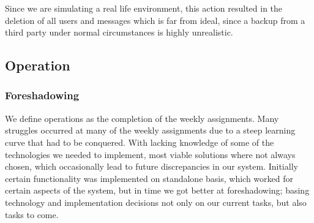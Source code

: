 \documentclass{article}
\begin{document}
    Since we are simulating a real life environment, this action resulted in the deletion of all users and messages which is far from ideal, since a backup from a third party under normal circumstances is highly unrealistic.

\subsection{Operation}
    \subsubsection{Foreshadowing}
    We define operations as the completion of the weekly assignments. Many struggles occurred at many of the weekly assignments due to a steep learning curve that had to be conquered. 
    With lacking knowledge of some of the technologies we needed to implement, most viable solutions where not always chosen, which occasionally lead to future discrepancies in our system. Initially certain functionality was implemented on standalone basis, which worked for certain aspects of the system, but in time we got better at foreshadowing; basing technology and implementation decisions not only on our current tasks, but also tasks to come.
\end{document}
